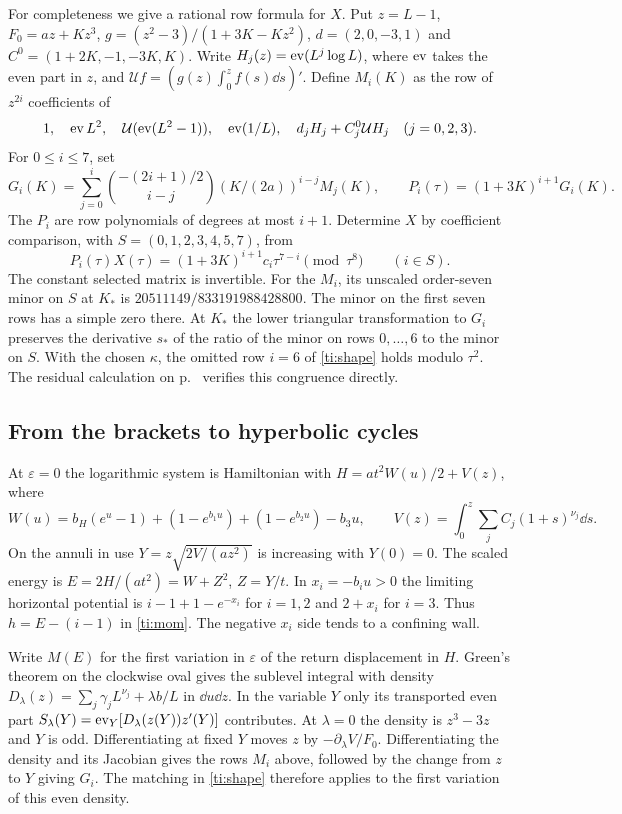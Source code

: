 For completeness we give a rational row formula for $X$. Put $z=L-1$,
$F_0=az+Kz^3$, $g=(z^2-3)/(1+3K-Kz^2)$,
$d=(2,0,-3,1)$ and $C^0=(1+2K,-1,-3K,K)$. Write $H_j(z)=\operatorname{ev}(L^j\log L)$,
where $\operatorname{ev}$ takes the even part in $z$, and
$\mathcal U f=(g(z)\int_0^z f(s)\dd s)'$. Define $M_i(K)$ as the row
of $z^{2i}$ coefficients of
\[
 1,\quad\operatorname{ev} L^2,\quad\mathcal U(\operatorname{ev}(L^2-1)),\quad\operatorname{ev}(1/L),\quad
 d_jH_j+C^0_j\mathcal U H_j\quad(j=0,2,3).
\]
For $0\le i\le7$, set
\[
 G_i(K)=\sum_{j=0}^i\binom{-(2i+1)/2}{i-j}(K/(2a))^{i-j}M_j(K),
 \qquad P_i(\tau)=(1+3K)^{i+1}G_i(K).
\]
The $P_i$ are row polynomials of degrees at most $i+1$. Determine $X$
by coefficient comparison, with $S=(0,1,2,3,4,5,7)$, from
\begin{equation}
 P_i(\tau)X(\tau)=(1+3K)^{i+1}c_i\tau^{7-i}\pmod{\tau^8}
 \qquad (i\in S).                                                    \label{ti:shape}
\end{equation}
The constant selected matrix is invertible. For the $M_i$, its unscaled
order-seven minor on $S$ at $K_*$ is $20511149/833191988428800$.
The minor on the first seven rows has a simple zero there.
At $K_*$ the lower triangular transformation to $G_i$ preserves the
derivative $s_*$ of the ratio of the minor on rows $0,\ldots,6$ to the minor on $S$.
With the chosen $\kappa$, the omitted row $i=6$ of \eqref{ti:shape} holds modulo $\tau^2$.
The residual calculation on p.~\pageref{ti:row-residuals} verifies this congruence directly.

\subsection{From the brackets to hyperbolic cycles}
At $\varepsilon=0$ the logarithmic system is Hamiltonian with
$H=at^2W(u)/2+V(z)$, where
\[
 W(u)=b_H(e^u-1)+(1-e^{b_1u})+(1-e^{b_2u})-b_3u,\qquad
 V(z)=\int_0^z\sum_j C_j(1+s)^{\nu_j}\dd s .
\]
On the annuli in use $Y=z\sqrt{2V/(az^2)}$ is increasing with $Y(0)=0$.
The scaled energy is $E=2H/(at^2)=W+Z^2$, $Z=Y/t$. In
$x_i=-b_i u>0$ the limiting horizontal potential is $i-1+1-e^{-x_i}$
for $i=1,2$ and $2+x_i$ for $i=3$. Thus $h=E-(i-1)$ in \eqref{ti:mom}.
The negative $x_i$ side tends to a confining wall.

Write $M(E)$ for the first variation in $\varepsilon$ of the return
displacement in $H$. Green's theorem on the clockwise oval gives the
sublevel integral with density
$D_\lambda(z)=\sum_j\gamma_jL^{\nu_j}+\lambda b/L$ in $\dd u\dd z$.
In the variable $Y$ only its transported even part
$S_\lambda(Y)=\operatorname{ev}_Y[D_\lambda(z(Y))z'(Y)]$ contributes.
At $\lambda=0$ the density is $z^3-3z$ and $Y$ is odd.
Differentiating at fixed $Y$ moves $z$ by $-\partial_\lambda V/F_0$.
Differentiating the density and its Jacobian gives the rows $M_i$
above, followed by the change from $z$ to $Y$ giving $G_i$.
The matching in \eqref{ti:shape} therefore applies to the first
variation of this even density.

